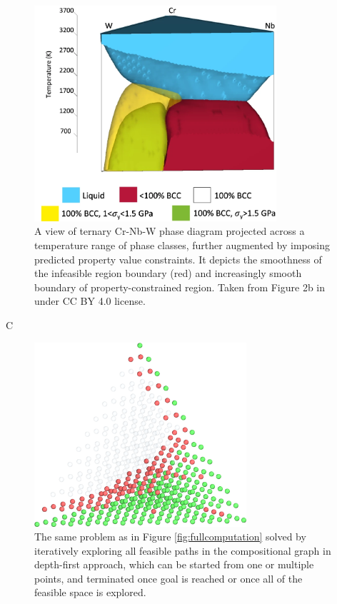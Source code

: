 \begin{figure}[h]
    \centering
    \includegraphics[width=0.8\textwidth]{infeasibilitygliding/PhaseTernaryMap_Elder2023.png}
    \caption{A view of ternary Cr-Nb-W phase diagram projected across a temperature range of phase classes, further augmented by imposing predicted property value constraints. It depicts the smoothness of the infeasible region boundary (red) and increasingly smooth boundary of property-constrained region. Taken from Figure 2b in \citet{Elder2023ComputationalValidation} under CC BY 4.0 license.}
    \label{infeasibilitygliding:fig:katesphasemap}
\end{figure}

C

\begin{figure}[h]
    \centering
    \includegraphics[width=0.7\textwidth]{infeasibilitygliding/InfeasibilityGliding_Glide.png}
    \caption{The same problem as in Figure \ref{fig:fullcomputation} solved by iteratively exploring all feasible paths in the compositional graph in depth-first approach, which can be started from one or multiple points, and terminated once goal is reached or once all of the feasible space is explored.}
    \label{infeasibilitygliding:fig:glide}
\end{figure}


\printbibliography[heading=subbibintoc]